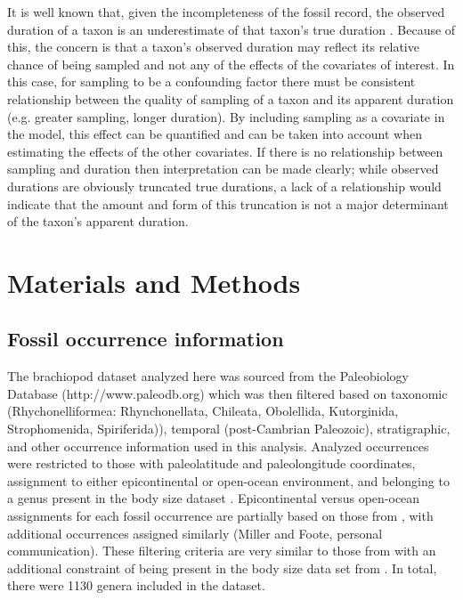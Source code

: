 \documentclass{article}
\begin{document}
It is well known that, given the incompleteness of the fossil record, the observed duration of a taxon is an underestimate of that taxon's true duration \citep{Solow1997,Wagner2013a,Wang2004,Liow2010b,Alroy2014a,Foote1996e}. Because of this, the concern is that a taxon's observed duration may reflect its relative chance of being sampled and not any of the effects of the covariates of interest. In this case, for sampling to be a confounding factor there must be consistent relationship between the quality of sampling of a taxon and its apparent duration (e.g. greater sampling, longer duration). By including sampling as a covariate in the model, this effect can be quantified and can be taken into account when estimating the effects of the other covariates. If there is no relationship between sampling and duration then interpretation can be made clearly; while observed durations are obviously truncated true durations, a lack of a relationship would indicate that the amount and form of this truncation is not a major determinant of the taxon's apparent duration.



\section{Materials and Methods}

\subsection{Fossil occurrence information}

The brachiopod dataset analyzed here was sourced from the Paleobiology Database (http://www.paleodb.org) which was then filtered based on taxonomic (Rhychonelliformea: Rhynchonellata, Chileata, Obolellida, Kutorginida, Strophomenida, Spiriferida)), temporal (post-Cambrian Paleozoic), stratigraphic, and other occurrence information used in this analysis. Analyzed occurrences were restricted to those with paleolatitude and paleolongitude coordinates, assignment to either epicontinental or open-ocean environment, and belonging to a genus present in the body size dataset \citep{Payne2014}. Epicontinental versus open-ocean assignments for each fossil occurrence are partially based on those from \citet{Miller2009a}, with additional occurrences assigned similarly (Miller and Foote, personal communication). These filtering criteria are very similar to those from \citet{Foote2013} with an additional constraint of being present in the body size data set from \citet{Payne2014}. In total, there were 1130 genera included in the dataset.
\end{document}
